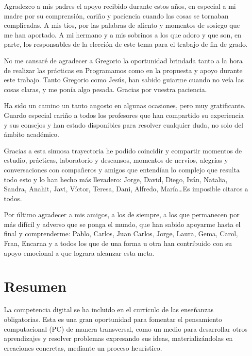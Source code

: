\documentclass[a4paper, 12pt]{book}
\begin{document}
Agradezco a mis padres el apoyo recibido durante estos años, en especial a mi madre por su comprensión, cariño y paciencia cuando las cosas se tornaban complicadas. A mis tíos, por las palabras de aliento y momentos de sosiego que me han aportado. A mi hermano y a mis sobrinos a los que adoro y que son, en parte, los responsables de la elección de este tema para el trabajo de fin de grado. 

No me cansaré de agradecer a Gregorio la oportunidad brindada tanto a la hora de realizar las prácticas en Programamos como en la propuesta y apoyo durante este trabajo. Tanto Gregorio como Jesús, han sabido guiarme cuando no veía las cosas claras, y me ponía algo pesada. Gracias por vuestra paciencia. 

Ha sido un camino un tanto angosto en algunas ocasiones, pero muy gratificante. Guardo especial cariño a todos los profesores que han compartido su experiencia y sus consejos y han estado disponibles para resolver cualquier duda, no solo del ámbito académico. 

Gracias a esta sinuosa trayectoria he podido coincidir y compartir momentos de estudio, prácticas, laboratorio y descansos, momentos de nervios, alegrías y conversaciones con compañeros y amigos que entendían lo complejo que resulta todo esto y lo han hecho más llevadero: Jorge, David, Diego, Iván, Natalia, Sandra, Anahit, Javi, Víctor, Teresa, Dani, Alfredo, María\ldots Es imposible citaros a todos.

Por último agradecer a mis amigos, a los de siempre, a los que permanecen por más difícil y adverso que se ponga el mundo, que han sabido apoyarme hasta el final y comprenderme: Pablo, Carlos, Juan Carlos, Jorge, Laura, Gema, Carol, Fran, Encarna y a todos los que de una forma u otra han contribuido con su apoyo emocional a que lograra alcanzar esta meta. 



\chapter*{Resumen}

La competencia digital se ha incluido en el currículo de las enseñanzas obligatorias. Esta es una gran oportunidad para fomentar el pensamiento computacional (PC) de manera transversal, como un medio para desarrollar otros aprendizajes y resolver problemas expresando sus ideas, materializándolas en creaciones concretas, mediante un proceso heurístico.
\end{document}
